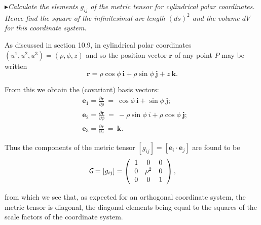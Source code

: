 \documentclass[9pt, twoside]{extbook}
\newcommand{\textbox}[1]{
	\begin{tcolorbox}[
			colback=boxGray,
			colframe=black,
			arc=0pt,
			top=0pt,
			right=0pt,
			bottom=0pt,
			left=0pt,
			boxrule=0.2pt
		]
		\small$\blacktriangleright$\textit{#1}
	\end{tcolorbox}
}
\newcommand{\latinmodern}[1]{\textsf{\itshape #1}}
\begin{document}
\pagebreak

\textbox{Calculate the elements $g_{ij}$ of the metric tensor for cylindrical polar coordinates. Hence find the square of the infinitesimal arc length $(ds)^{2}$ and the volume $dV$ for this coordinate system.}

\noindent \small As discussed in section 10.9, in cylindrical polar coordinates $(u^{1},u^{2},u^{3}) = (\rho,\phi,z)$ and so the position vector $\boldsymbol{r}$ of any point $P$ may be written
\begin{equation*}
	\boldsymbol{r} = \rho \cos{\phi} \ \boldsymbol{i} + \rho \sin{\phi} \ \boldsymbol{j} + z \ \boldsymbol{k}.
\end{equation*}

\noindent From this we obtain the (covariant) basis vectors:
\begin{align}
	  & \boldsymbol{e}_{1} = \frac{\partial\boldsymbol{r}}{\partial\rho} \ = \ \cos{\phi} \ \boldsymbol{i} + \sin{\phi} \ \boldsymbol{j}; \nonumber \\
	  & \boldsymbol{e}_{2} = \frac{\partial\boldsymbol{r}}{\partial\phi} \ = \ - \rho \sin{\phi} \ i + \rho \cos{\phi} \ \boldsymbol{j}; \nonumber \\
	  & \boldsymbol{e}_{3} = \frac{\partial\boldsymbol{r}}{\partial z} \ = \ \boldsymbol{k}.
\end{align}

Thus the components of the metric tensor $[g_{ij}]=[\boldsymbol{e}_{i} \cdot \boldsymbol{e}_{j}]$ are found to be
\begin{equation}
	\label{eq:3}
	\latinmodern{G} = [g_{ij}] =
	\begin{pmatrix}
		\hspace{2mm} 1 & 0      & 0 \hspace{2mm} \\
		\hspace{2mm} 0 & \rho^2 & 0 \hspace{2mm} \\
		\hspace{2mm} 0 & 0      & 1 \hspace{2mm}
	\end{pmatrix},
\end{equation}

\noindent from which we see that, as expected for an orthogonal coordinate system, the metric tensor \linebreak is diagonal, the diagonal elements being equal to the squares of the scale factors of the \linebreak coordinate system.
\end{document}
